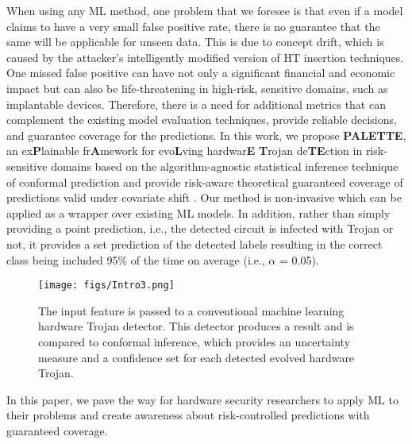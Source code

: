 \documentclass[9pt,conference]{IEEEtran}
\begin{document}
When using any ML method, one problem that we foresee is that even if a model claims to have a very small false positive rate, there is no guarantee that the same will be applicable for unseen data. This is due to concept drift, which is caused by the attacker's intelligently modified version of HT insertion techniques. One missed false positive can have not only a significant financial and economic impact but can also be life-threatening in high-risk, sensitive domains, such as implantable devices. Therefore, there is a need for additional metrics that can complement the existing model evaluation techniques, provide reliable decisions, and guarantee coverage for the predictions. In this work, we propose \textbf{PALETTE}, an ex\textbf{P}lainable fr\textbf{A}mework for evo\textbf{L}ving hardwar\textbf{E} \textbf{T}rojan de\textbf{TE}ction in risk-sensitive domains based on the algorithm-agnostic statistical inference technique of conformal prediction \cite{shafer2008tutorial} and provide risk-aware theoretical guaranteed coverage of predictions valid under covariate shift \cite{tibshirani2019conformal}. Our method is non-invasive which can be applied as a wrapper over existing ML models. In addition, rather than simply providing a point prediction, i.e., the detected circuit is infected with Trojan or not, it provides a set prediction of the detected labels resulting in the correct class being included 95\% of the time on average (i.e., $\alpha$ = 0.05).

\begin{figure*}[ht]
  \centering
   \texttt{[image: figs/Intro3.png]}
   \caption{The input feature is passed to a conventional machine learning hardware Trojan detector. This detector produces a result and is compared to conformal inference, which provides an uncertainty measure and a confidence set for each detected evolved hardware Trojan.}
  \label{fig:intro}
\end{figure*}

In this paper, we pave the way for hardware security researchers to apply ML to their problems and create awareness about risk-controlled predictions with guaranteed coverage.
\end{document}
